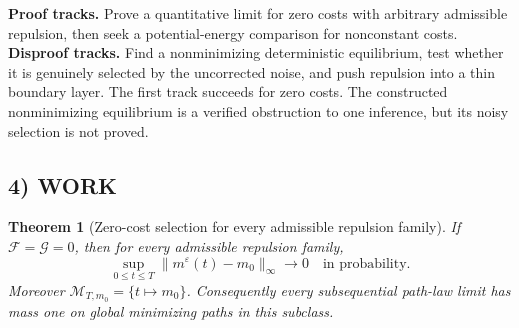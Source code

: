 \documentclass[11pt,a4paper]{article}
\newtheorem{theorem}{Theorem}[section]
\theoremstyle{definition}
\theoremstyle{remark}
\begin{document}
\textbf{Proof tracks.} Prove a quantitative limit for zero costs with arbitrary admissible repulsion, then seek a potential-energy comparison for nonconstant costs. \textbf{Disproof tracks.} Find a nonminimizing deterministic equilibrium, test whether it is genuinely selected by the uncorrected noise, and push repulsion into a thin boundary layer. The first track succeeds for zero costs. The constructed nonminimizing equilibrium is a verified obstruction to one inference, but its noisy selection is not proved.

\subsection*{4) WORK}
\begin{theorem}[Zero-cost selection for every admissible repulsion family]
If $\mathcal F=\mathcal G=0$, then for every admissible repulsion family,
\[
 \sup_{0\leq t\leq T}\|m^\varepsilon(t)-m_0\|_\infty
 \longrightarrow0\quad\text{in probability}.
\]
Moreover $\mathcal M_{T,m_0}=\{t\mapsto m_0\}$. Consequently every subsequential path-law limit has mass one on global minimizing paths in this subclass.
\end{theorem}
\end{document}
